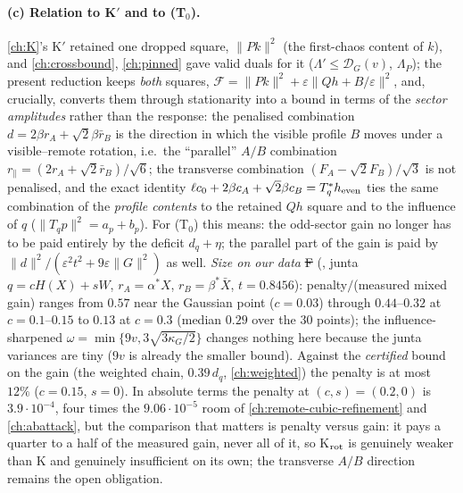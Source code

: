 \paragraph{(c) Relation to K$'$ and to (T$_0$).} \autoref{ch:K}'s K$'$ retained one dropped square, $\|Pk\|^2$ (the first-chaos content of $k$), and \autoref{ch:crossbound},
\autoref{ch:pinned} gave valid duals for it ($\Lambda'\le\mathcal D_G(v)$, $\Lambda_P$); the present reduction keeps \emph{both} squares, $\mathcal F=\|Pk\|^2+\varepsilon\|Qh+B/\varepsilon\|^2$, and, crucially,
converts them through stationarity into a bound in terms of the \emph{sector amplitudes} rather than the response: the penalised combination $d=2\beta r_A+\sqrt2\beta\bar r_B$ is the direction
in which the visible profile $B$ moves under a visible--remote rotation, i.e.\ the ``parallel'' $A/B$ combination $r_\parallel=(2r_A+\sqrt2\bar r_B)/\sqrt6$; the transverse combination
$(F_A-\sqrt2F_B)/\sqrt3$ is not penalised, and the exact identity $\ell c_0+2\beta c_A+\sqrt2\beta c_B=T_q^*h_{\rm even}$ ties the same combination of the \emph{profile contents} to the retained
$Qh$ square and to the influence of $q$ ($\|T_qp\|^2=a_p+b_p$). For (T$_0$) this means: the odd-sector gain no longer has to be paid entirely by the deficit $d_q+\eta$; the parallel part of the gain
is paid by $\|d\|^2/(\varepsilon^2t^2+9\varepsilon\|G\|^2)$ as well. \emph{Size on our data} \st{F} (, junta $q=cH(X)+sW$, $r_A=\alpha^*X$, $r_B=\beta^*\bar X$, $t=0.8456$):
penalty$/$(measured mixed gain) ranges from $0.57$ near the Gaussian point ($c=0.03$) through $0.44$--$0.32$ at $c=0.1$--$0.15$ to $0.13$ at $c=0.3$ (median $0.29$ over the 30 points); the
influence-sharpened $\omega=\min\{9v,3\sqrt{3\kappa_G/2}\}$ changes nothing here because the junta variances are tiny ($9v$ is already the smaller bound). Against the \emph{certified} bound on the
gain (the weighted chain, $0.39\,d_q$, \autoref{ch:weighted}) the penalty is at most $12\%$ ($c=0.15$, $s=0$). In absolute terms the penalty at $(c,s)=(0.2,0)$ is $3.9\cdot10^{-4}$, four times the
$9.06\cdot10^{-5}$ room of \autoref{ch:remote-cubic-refinement} and \autoref{ch:abattack}, but the comparison that matters is penalty versus gain: it pays a quarter to a half of the measured
gain, never all of it, so K$_{\rm rot}$ is genuinely weaker than K and genuinely insufficient on its own; the transverse $A/B$ direction remains the open obligation.
